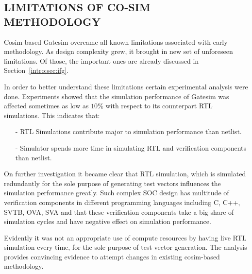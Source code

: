 \subsection {LIMITATIONS OF CO-SIM METHODOLOGY}

Cosim based Gatesim overcame all known limitations associated with early methodology. As design complexity grew, it brought in new set of unforeseen limitations. Of those, the important ones are already discussed in Section~\ref{intro:sec:ifg}.

In order to better understand these limitations certain experimental analysis were done. Experiments showed that the simulation performance of Gatesim was affected sometimes as low as $10\%$ with respect to its counterpart RTL simulations. This indicates that:

\begin{itemize}
	\item[-]RTL Simulations contribute major to simulation performance than netlist.
	\item[-]Simulator spends more time in simulating RTL and verification components than netlist.
\end{itemize}

On further investigation it became clear that RTL simulation, which is simulated redundantly for the sole purpose of generating test vectors influences the simulation performance greatly. Such complex SOC design has multitude of verification components in different programming languages including C, C++, SVTB, OVA, SVA and that these verification components take a big share of simulation cycles and have negative effect on simulation performance.

Evidently it was not an appropriate use of compute resources by having live RTL simulation every time, for the sole purpose of test vector generation. The analysis provides convincing evidence to attempt changes in existing cosim-based methodology.

